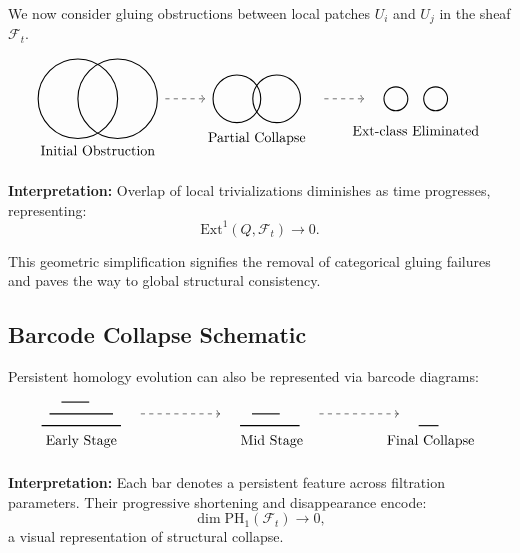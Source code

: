 \documentclass[11pt]{article}
\begin{document}
We now consider gluing obstructions between local patches \( U_i \) and \( U_j \) in the sheaf \( \mathcal{F}_t \).

\[
\begin{tikzpicture}
\draw[thick] (0,0) circle (1);
\draw[thick] (1,0) circle (1);
\node at (0.5, -1.3) {Initial Obstruction};

\draw[dashed,->] (2.2,0) -- (3.2,0);
\draw[thick] (4,0) circle (0.6);
\draw[thick] (5,0) circle (0.6);
\node at (4.5, -1.0) {Partial Collapse};

\draw[dashed,->] (6.2,0) -- (7.2,0);
\draw[thick] (8,0) circle (0.3);
\draw[thick] (9,0) circle (0.3);
\node at (8.5, -0.8) {Ext-class Eliminated};
\end{tikzpicture}
\]

\textbf{Interpretation:}
Overlap of local trivializations diminishes as time progresses, representing:
\[
\mathrm{Ext}^1(Q, \mathcal{F}_t) \longrightarrow 0.
\]

This geometric simplification signifies the removal of categorical gluing failures and paves the way to global structural consistency.

\subsection{Barcode Collapse Schematic}

Persistent homology evolution can also be represented via barcode diagrams:

\[
\begin{tikzpicture}
\draw[thick] (0,0) -- (2,0);
\draw[thick] (0.2,0.3) -- (1.8,0.3);
\draw[thick] (0.5,0.6) -- (1.2,0.6);
\node at (1.0, -0.4) {Early Stage};

\draw[dashed,->] (2.5,0.3) -- (4.5,0.3);

\draw[thick] (5,0) -- (6.5,0);
\draw[thick] (5.3,0.3) -- (6.0,0.3);
\node at (5.8, -0.4) {Mid Stage};

\draw[dashed,->] (7.0,0.3) -- (9.0,0.3);

\draw[thick] (9.5,0) -- (10,0);
\node at (9.8, -0.4) {Final Collapse};
\end{tikzpicture}
\]

\textbf{Interpretation:}
Each bar denotes a persistent feature across filtration parameters. Their progressive shortening and disappearance encode:
\[
\dim \mathrm{PH}_1(\mathcal{F}_t) \longrightarrow 0,
\]
a visual representation of structural collapse.
\end{document}
